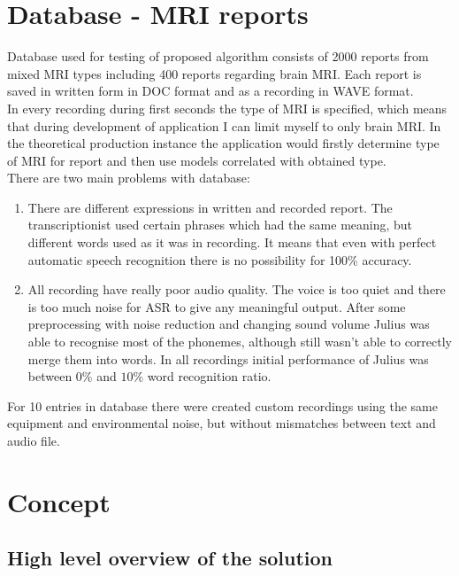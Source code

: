 \documentclass[a4paper,11pt,twoside]{report}
\theoremstyle{definition}
\begin{document}
\chapter{Database - MRI reports}

Database used for testing of proposed algorithm consists of 2000 reports from mixed MRI types including 400 reports regarding brain MRI. Each report is saved in written form in DOC format and as a recording in WAVE format. \\
In every recording during first seconds the type of MRI is specified, which means that during development of application I can limit myself to only brain MRI. In the theoretical production instance the application would firstly determine type of MRI for report and then use models correlated with obtained type.\\

\noindent There are two main problems with database:
\begin{enumerate}
    \item There are different expressions in written and recorded report. The transcriptionist used certain phrases which had the same meaning, but different words used as it was in recording. It means that even with perfect automatic speech recognition there is no possibility for 100\% accuracy.
    \item All recording have really poor audio quality. The voice is too quiet and there is too much noise for ASR to give any meaningful output. After some preprocessing with noise reduction and changing sound volume Julius was able to recognise most of the phonemes, although still wasn't able to correctly merge them into words. In all recordings initial performance of Julius was between $0\%$ and $10\%$ word recognition ratio. 
\end{enumerate}

For 10 entries in database there were created custom recordings using the same equipment and environmental noise, but without mismatches between text and audio file.

\chapter{Concept}

\section{High level overview of the solution}
\end{document}
